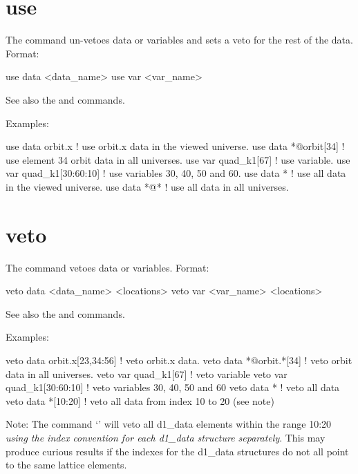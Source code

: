 {{{%
\section{use}
\label{s:use}

The  command un-vetoes data or variables and sets a veto for
the rest of the data. Format:
\begin{example}
  use data  <data_name>
  use var <var_name>
\end{example}

\vskip 0.2in 

See also the  and  commands.

Examples:
\begin{example}
  use data orbit.x             ! use orbit.x data in the viewed universe.
  use data *@orbit[34]         ! use element 34 orbit data in all universes.
  use var quad_k1[67]          ! use variable.
  use var quad_k1[30:60:10]    ! use variables 30, 40, 50 and 60.
  use data *                   ! use all data in the viewed universe.
  use data *@*                 ! use all data in all universes.
\end{example}


\section{veto}
\label{s:veto}

The  command vetoes data or variables. Format:
\begin{example}
  veto data <data_name> <locations>
  veto var <var_name> <locations>
\end{example}

\vskip 0.1in 

See also the  and  commands.

Examples:
\begin{example}
  veto data orbit.x[23,34:56]  ! veto orbit.x data.
  veto data *@orbit.*[34]      ! veto orbit data in all universes.
  veto var quad_k1[67]         ! veto variable
  veto var quad_k1[30:60:10]   ! veto variables 30, 40, 50 and 60
  veto data *                  ! veto all data
  veto data *[10:20]           ! veto all data from index 10 to 20 (see note)
\end{example}

Note: The command `' will veto all d1\_data elements
within the range 10:20 \textit{using the index convention for each d1\_data
structure separately}. This may produce curious results if the
indexes for the d1\_data structures do not all point to the same lattice
elements. 

}}}
